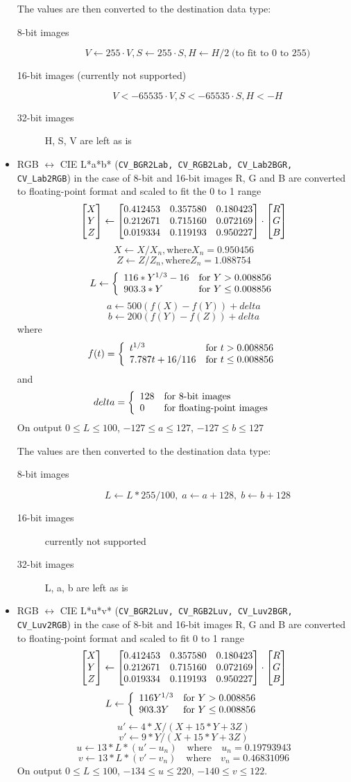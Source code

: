\begin{itemize}
The values are then converted to the destination data type:
\begin{description}
\item[8-bit images]
\[ V \leftarrow 255\cdot V, S \leftarrow 255\cdot S, H \leftarrow H/2\; \text{(to fit to 0 to 255)} \]
\item[16-bit images (currently not supported)]
\[ V <- 65535\cdot V, S <- 65535\cdot S, H <- H \]
\item[32-bit images]
H, S, V are left as is
\end{description}

 \item RGB $\leftrightarrow$ CIE L*a*b* (\texttt{CV\_BGR2Lab, CV\_RGB2Lab, CV\_Lab2BGR, CV\_Lab2RGB})
  in the case of 8-bit and 16-bit images
  R, G and B are converted to floating-point format and scaled to fit the 0 to 1 range
\[ \begin{bmatrix} X\\ Y\\ Z \end{bmatrix} \leftarrow \begin{bmatrix} 0.412453 & 0.357580 & 0.180423\\ 0.212671 & 0.715160 & 0.072169\\ 0.019334 & 0.119193 & 0.950227 \end{bmatrix}
\cdot
\begin{bmatrix} R\\ G\\ B \end{bmatrix} \]
\[ X \leftarrow X/X_n, \text{where} X_n = 0.950456 \]
\[ Z \leftarrow Z/Z_n, \text{where} Z_n = 1.088754 \]
\[ L \leftarrow \left\{ \begin{array}{l l} 116*Y^{1/3}-16 & \mbox{for $Y>0.008856$}\\ 903.3*Y & \mbox{for $Y \le 0.008856$}\\ \end{array} \right. \]
\[ a \leftarrow 500 (f(X)-f(Y)) + delta \]
\[ b \leftarrow 200 (f(Y)-f(Z)) + delta \]
where
\[f(t)=\left\{ \begin{array}{l l} t^{1/3} & \mbox{for $t>0.008856$}\\ 7.787 t+16/116 & \mbox{for $t\leq 0.008856$}\\ \end{array} \right. \]
and
\[ delta = \left\{ \begin{array}{l l} 128 & \mbox{for 8-bit images}\\ 0 & \mbox{for floating-point images}\\ \end{array} \right. \]
On output $0 \leq L \leq 100$, $-127 \leq a \leq 127$, $-127 \leq b \leq 127$

The values are then converted to the destination data type:
\begin{description}
\item[8-bit images]
\[L \leftarrow L*255/100,\; a \leftarrow a + 128,\; b \leftarrow b + 128\]
\item[16-bit images] currently not supported
\item[32-bit images]
L, a, b are left as is
\end{description}

 \item RGB $\leftrightarrow$ CIE L*u*v* (\texttt{CV\_BGR2Luv, CV\_RGB2Luv, CV\_Luv2BGR, CV\_Luv2RGB})
  in the case of 8-bit and 16-bit images
  R, G and B are converted to floating-point format and scaled to fit 0 to 1 range
  \[ \begin{bmatrix} X\\ Y\\ Z \end{bmatrix} \leftarrow \begin{bmatrix} 0.412453 & 0.357580 & 0.180423\\ 0.212671 & 0.715160 & 0.072169\\ 0.019334 & 0.119193 & 0.950227 \end{bmatrix}
\cdot
\begin{bmatrix} R\\ G\\ B \end{bmatrix} \]
\[ L \leftarrow \left\{ \begin{array}{l l} 116 Y^{1/3} & \mbox{for $Y>0.008856$}\\ 903.3 Y & \mbox{for $Y\leq 0.008856$}\\ \end{array} \right. \]
\[ u' \leftarrow 4*X/(X + 15*Y + 3 Z) \]
\[ v' \leftarrow 9*Y/(X + 15*Y + 3 Z) \]
\[ u \leftarrow 13*L*(u' - u_n) \quad \text{where} \quad u_n=0.19793943 \]
\[ v \leftarrow 13*L*(v' - v_n) \quad \text{where} \quad v_n=0.46831096 \]
On output $0 \leq L \leq 100$, $-134 \leq u \leq 220$, $-140 \leq v \leq 122$.


\end{itemize}
